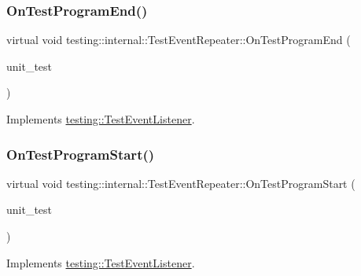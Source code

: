 \subsubsection{\texorpdfstring{On\+Test\+Program\+End()}{OnTestProgramEnd()}}
{\footnotesize\ttfamily virtual void testing\+::internal\+::\+Test\+Event\+Repeater\+::\+On\+Test\+Program\+End (\begin{DoxyParamCaption}\item[{const \hyperlink{classtesting_1_1UnitTest}{Unit\+Test} \&}]{unit\+\_\+test }\end{DoxyParamCaption})\hspace{0.3cm}{\ttfamily [virtual]}}



Implements \hyperlink{classtesting_1_1TestEventListener_ad15b6246d94c268e233487a86463ef3d}{testing\+::\+Test\+Event\+Listener}.

\mbox{\label{classtesting_1_1internal_1_1TestEventRepeater_a15ee2ff051063088d3a89a266d5ffcc4}} 
\subsubsection{\texorpdfstring{On\+Test\+Program\+Start()}{OnTestProgramStart()}}
{\footnotesize\ttfamily virtual void testing\+::internal\+::\+Test\+Event\+Repeater\+::\+On\+Test\+Program\+Start (\begin{DoxyParamCaption}\item[{const \hyperlink{classtesting_1_1UnitTest}{Unit\+Test} \&}]{unit\+\_\+test }\end{DoxyParamCaption})\hspace{0.3cm}{\ttfamily [virtual]}}



Implements \hyperlink{classtesting_1_1TestEventListener_a5f6c84f39851e8a603a2d2e10063816b}{testing\+::\+Test\+Event\+Listener}.

\mbox{\label{classtesting_1_1internal_1_1TestEventRepeater_a70d694ca5010cc86cd458f7f529e6fbe}} 

